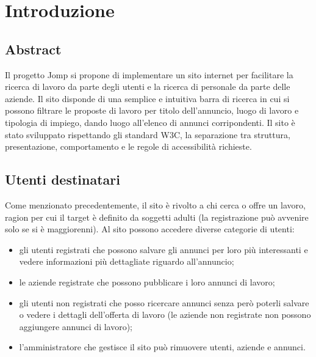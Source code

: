 \section{Introduzione}
	\subsection{Abstract}
	Il progetto Jomp si propone di implementare un sito internet per facilitare la ricerca di lavoro da parte degli utenti e la ricerca di personale da parte delle aziende. Il sito disponde di una semplice e intuitiva barra di ricerca in cui si possono filtrare le proposte di lavoro per titolo dell'annuncio, luogo di lavoro e tipologia di impiego, dando luogo all'elenco di annunci corripondenti.
	Il sito è stato sviluppato rispettando gli standard W3C, la separazione tra struttura, presentazione, comportamento e le regole di accessibilità richieste. 
	\subsection{Utenti destinatari}
	Come menzionato precedentemente, il sito è rivolto a chi cerca o offre un lavoro, ragion per cui il target è definito da soggetti adulti (la registrazione può avvenire solo se si è maggiorenni).
Al sito possono accedere diverse categorie di utenti: 
\begin{itemize}
\item gli utenti registrati che possono salvare gli annunci per loro più interessanti e vedere informazioni più dettagliate riguardo all'annuncio; 
\item le aziende registrate che possono pubblicare i loro annunci di lavoro;
\item gli utenti non registrati che posso ricercare annunci senza però poterli salvare o vedere i dettagli dell'offerta di lavoro (le aziende non registrate non possono aggiungere annunci di lavoro); 
\item l'amministratore che gestisce il sito può rimuovere utenti, aziende e annunci.
\end{itemize}
